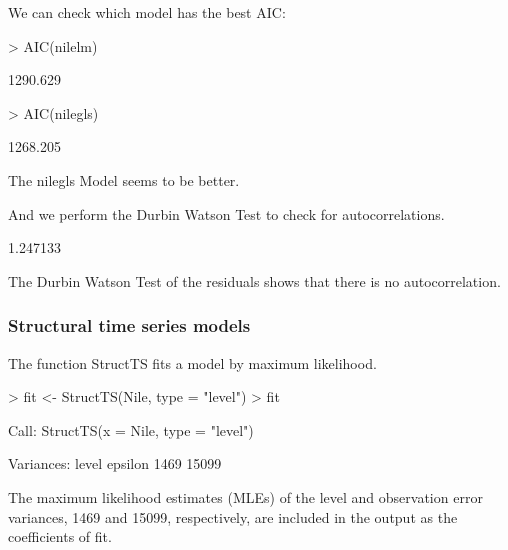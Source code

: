 \documentclass[11pt, a4paper]{article} %
\begin{document}
\noindent We can check which model has the best AIC:
\begin{Schunk}
\begin{Sinput}
> AIC(nilelm)
\end{Sinput}
\begin{Soutput}
[1] 1290.629
\end{Soutput}
\begin{Sinput}
> AIC(nilegls)
\end{Sinput}
\begin{Soutput}
[1] 1268.205
\end{Soutput}
\end{Schunk}
\noindent The nilegls Model seems to be better.

\noindent And we perform the Durbin Watson Test to check for autocorrelations.
\begin{Schunk}
\begin{Soutput}
[1] 1.247133
\end{Soutput}
\end{Schunk}
\noindent The Durbin Watson Test of the residuals shows that there is no autocorrelation.


\subsubsection{Structural time series models}

\noindent The function StructTS fits a model by maximum likelihood.
\begin{Schunk}
\begin{Sinput}
> fit <- StructTS(Nile, type = "level")
> fit
\end{Sinput}
\begin{Soutput}
Call:
StructTS(x = Nile, type = "level")

Variances:
  level  epsilon  
   1469    15099  
\end{Soutput}
\end{Schunk}
\noindent The maximum likelihood estimates (MLEs) of the level and observation error variances, 1469 and 15099, respectively, are included in the output as the coefficients of fit. 
\end{document}
